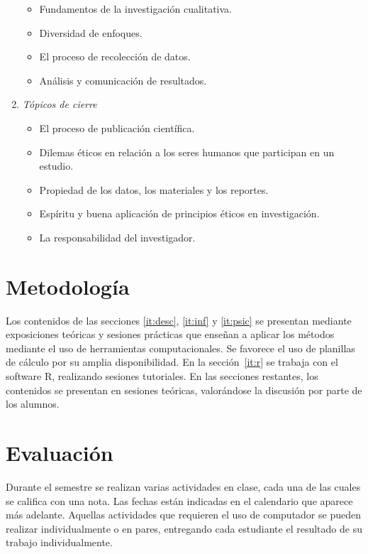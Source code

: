 \documentclass[letterpaper,11pt]{article}
\begin{document}
\begin{enumerate}
  \begin{itemize}
    \item Fundamentos de la investigación cualitativa.
    \item Diversidad de enfoques.
    \item El proceso de recolección de datos.
    \item Análisis y comunicación de resultados.
  \end{itemize}

  \item \emph{Tópicos de cierre}
  \begin{itemize}
    \item El proceso de publicación científica.
    \item Dilemas éticos en relación a los seres humanos que participan en un estudio.
    \item Propiedad de los datos, los materiales y los reportes.
    \item Espíritu y buena aplicación de principios éticos en investigación.
    \item La responsabilidad del investigador.
  \end{itemize}
\end{enumerate}


\section{Metodolog\'ia}

Los contenidos de las secciones \ref{it:desc}, \ref{it:inf} y \ref{it:psic} se presentan mediante exposiciones te\'oricas y sesiones pr\'acticas que ense\~nan a aplicar los m\'etodos mediante el uso de herramientas computacionales. Se favorece el uso de planillas de c\'alculo por su amplia disponibilidad. En la secci\'on~\ref{it:r} se trabaja con el software R, realizando sesiones tutoriales. En las secciones restantes, los contenidos se presentan en sesiones te\'oricas, valor\'andose la discusi\'on por parte de los alumnos.

\section{Evaluaci\'on}

Durante el semestre se realizan varias actividades en clase, cada una de las cuales se califica con una nota. Las fechas están indicadas en el calendario que aparece m\'as adelante. Aquellas actividades que requieren el uso de computador se pueden realizar individualmente o en pares, entregando cada estudiante el resultado de su trabajo individualmente.
\end{document}
